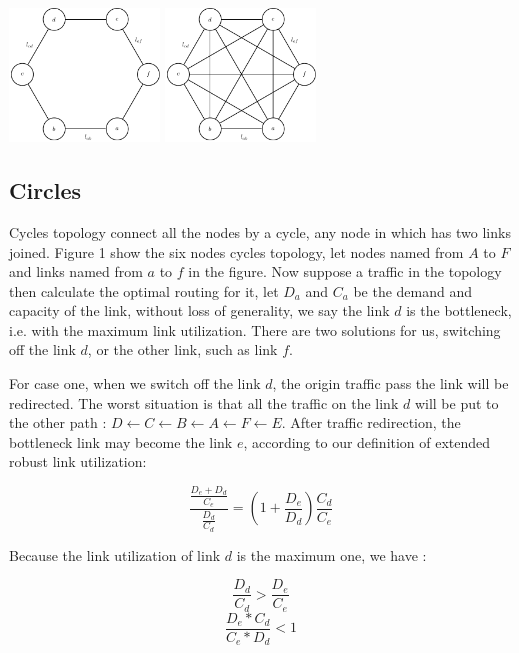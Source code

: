 \documentclass[conference]{IEEEtran}
\begin{document}
\vspace*{0.2in}
\includegraphics[width=4cm]{circle}
\includegraphics[width=4cm]{clique}
\vspace*{0.2in}

\subsection{Circles}
Cycles topology connect all the nodes by a cycle, any node in which has two links joined. Figure 1 show the six
nodes cycles topology, let nodes named from $A$ to $F$ and links named from $a$ to $f$ in the figure.
Now suppose a traffic in the topology then calculate the optimal routing for it,
let $D_a$ and $C_a$ be the demand and capacity of the link, without loss of generality, we say the link $d$ is the 
bottleneck, i.e. with the maximum link utilization. There are two solutions for us, switching off the link $d$,
or the other link, such as link $f$.


For case one, when we switch off the link $d$, the origin traffic pass the link will be redirected. The worst situation
is that all the traffic on the link $d$ will be put to the other path : $D \leftarrow C \leftarrow B \leftarrow A \leftarrow 
F \leftarrow E$. After traffic redirection, the bottleneck link may become the link $e$, according to our definition of
extended robust link utilization:

\begin{equation}
    \frac {\frac{D_e + D_d} {C_e}} {\frac {D_d}{C_d}} = (1 + \frac{D_e}{D_d}) \frac{C_d}{C_e}
\end{equation}

Because the link utilization of link $d$ is the maximum one, we have :

\begin{equation}
    \frac{D_d}{C_d} > \frac{D_e}{C_e} 
\end{equation}
\begin{equation}
    \frac{D_e * C_d}{C_e * D_d} < 1
\end{equation}
\end{document}
